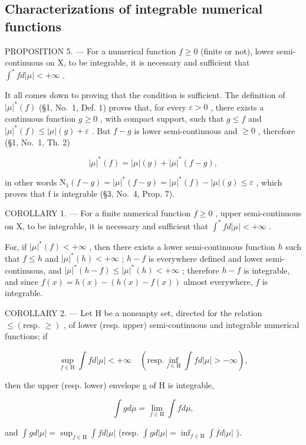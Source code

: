\subsection{Characterizations of integrable numerical functions}

PROPOSITION 5. --- For a numerical function \(f \geqslant 0\) (finite or not), lower semi-continuous on X, to be integrable, it is necessary and sufficient that \(\int^{*} f d|\mu| < +\infty\) .

It all comes down to proving that the condition is sufficient. The definition of \(|\mu|^*(f)\) (§1, No.~1, Def. 1) proves that, for every \(\varepsilon > 0\) , there exists a continuous function \(g \geqslant 0\) , with compact support, such that \(g \leqslant f\) and \(|\mu|^*(f) \leqslant |\mu|(g) + \varepsilon\) . But \(f - g\) is lower semi-continuous and \(\geqslant 0\) , therefore (§1, No.~1, Th. 2)

\[
| \mu | ^ {*} (f) = | \mu | (g) + | \mu | ^ {*} (f - g),
\]

in other words \(\mathrm{N}_{1}(f-g)=|\mu|^{*}(f-g)=|\mu|^{*}(f)-|\mu|(g)\leqslant\varepsilon\) , which proves that f is integrable (§3, No.~4, Prop. 7).

COROLLARY 1. --- For a finite numerical function \(f \geqslant 0\) , upper semi-continuous on X, to be integrable, it is necessary and sufficient that \(\int^{*} f d|\mu| < +\infty\) .

For, if \(|\mu|^*(f) < +\infty\) , then there exists a lower semi-continuous function \(h\) such that \(f \leqslant h\) and \(|\mu|^*(h) < +\infty\) ; \(h - f\) is everywhere defined and lower semi-continuous, and \(|\mu|^*(h - f) \leqslant |\mu|^*(h) < +\infty\) ; therefore \(h - f\) is integrable, and since \(f(x) = h(x) - (h(x) - f(x))\) almost everywhere, \(f\) is integrable.

COROLLARY 2. --- Let H be a nonempty set, directed for the relation \(\leqslant (\text{resp. } \geqslant)\) , of lower (resp. upper) semi-continuous and integrable numerical functions; if

\[
\sup _ {f \in \mathrm{H}} \int f d | \mu | <   + \infty \quad (\mathrm{resp.} \inf _ {f \in \mathrm{H}} \int f d | \mu | > - \infty),
\]

then the upper (resp. lower) envelope g of H is integrable,

\[
\int g d \mu = \lim _ {f \in \mathrm{H}} \int f d \mu ,
\]

and \(\int g d|\mu| = \sup_{f\in \mathrm{H}}\int f d|\mu|\) (resp. \(\int g d|\mu| = \inf_{f\in \mathrm{H}}\int f d|\mu|\) ).

